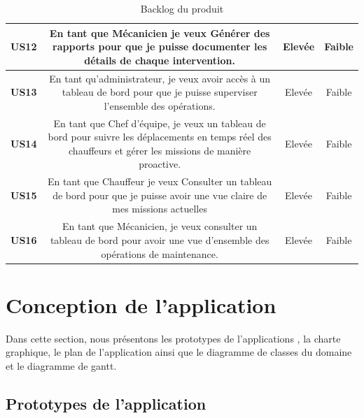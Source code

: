 \begin{table}[htbp]
  \centering
  \renewcommand{\arraystretch}{4.15} %
  \begin{tabular}{|c|c|c|c|}

    \hline
    \textbf{US12} & \parbox{11cm}{\centering En tant que Mécanicien je veux Générer des rapports pour que je puisse documenter les détails de chaque intervention.}                                       & Elevée & Faible \\
    \hline
    \textbf{US13} & \parbox{11cm}{\centering En tant qu’administrateur, je veux avoir accès à un tableau de bord pour que je puisse superviser l'ensemble des opérations.}                                & Elevée & Faible \\
    \hline
    \textbf{US14} & \parbox{11cm}{\centering En tant que Chef d'équipe, je veux un tableau de bord pour suivre les déplacements en temps réel des chauffeurs et gérer les missions de manière proactive.} & Elevée & Faible \\
    \hline
    \textbf{US15} & \parbox{11cm}{\centering En tant que Chauffeur je veux Consulter un tableau de bord pour que je puisse avoir une vue claire de mes missions actuelles}                                & Elevée & Faible \\
    \hline
    \textbf{US16} & \parbox{11cm}{\centering En tant que Mécanicien, je veux consulter un tableau de bord pour avoir une vue d'ensemble des opérations de maintenance.}                                   & Elevée & Faible \\
    \hline
  \end{tabular}
  \bigskip
  \caption{Backlog du produit}
  \label{tab:my_label}
\end{table}






\newpage{}
\section{Conception de l'application}

Dans cette section, nous présentons les prototypes de l'applications , la charte graphique, le plan de l'application ainsi que le diagramme de classes du domaine et le diagramme de gantt.

\subsection{Prototypes de l'application}


